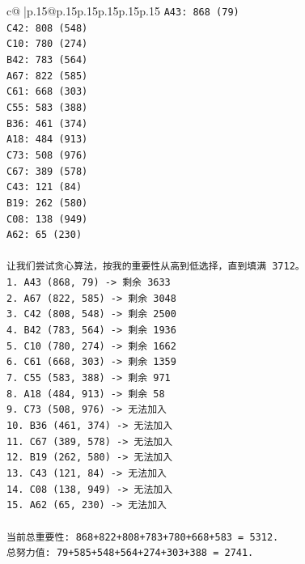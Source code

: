 \documentclass{article}
\begin{document}
{\begin{supertabular}{c@{$\;$}|p{.15\linewidth}@{}p{.15\linewidth}p{.15\linewidth}p{.15\linewidth}p{.15\linewidth}p{.15\linewidth}}
{{{\texttt{A43: 868 (79)} \\
\texttt{C42: 808 (548)} \\
\texttt{C10: 780 (274)} \\
\texttt{B42: 783 (564)} \\
\texttt{A67: 822 (585)} \\
\texttt{C61: 668 (303)} \\
\texttt{C55: 583 (388)} \\
\texttt{B36: 461 (374)} \\
\texttt{A18: 484 (913)} \\
\texttt{C73: 508 (976)} \\
\texttt{C67: 389 (578)} \\
\texttt{C43: 121 (84)} \\
\texttt{B19: 262 (580)} \\
\texttt{C08: 138 (949)} \\
\texttt{A62: 65 (230)} \\
\\ 
\texttt{让我们尝试贪心算法，按我的重要性从高到低选择，直到填满 3712。} \\
\texttt{1. A43 (868, 79) {-}> 剩余 3633} \\
\texttt{2. A67 (822, 585) {-}> 剩余 3048} \\
\texttt{3. C42 (808, 548) {-}> 剩余 2500} \\
\texttt{4. B42 (783, 564) {-}> 剩余 1936} \\
\texttt{5. C10 (780, 274) {-}> 剩余 1662} \\
\texttt{6. C61 (668, 303) {-}> 剩余 1359} \\
\texttt{7. C55 (583, 388) {-}> 剩余 971} \\
\texttt{8. A18 (484, 913) {-}> 剩余 58} \\
\texttt{9. C73 (508, 976) {-}> 无法加入} \\
\texttt{10. B36 (461, 374) {-}> 无法加入} \\
\texttt{11. C67 (389, 578) {-}> 无法加入} \\
\texttt{12. B19 (262, 580) {-}> 无法加入} \\
\texttt{13. C43 (121, 84) {-}> 无法加入} \\
\texttt{14. C08 (138, 949) {-}> 无法加入} \\
\texttt{15. A62 (65, 230) {-}> 无法加入} \\
\\ 
\texttt{当前总重要性: 868+822+808+783+780+668+583 = 5312.} \\
\texttt{总努力值: 79+585+548+564+274+303+388 = 2741.} \\
}}}
\end{supertabular}}
\end{document}
